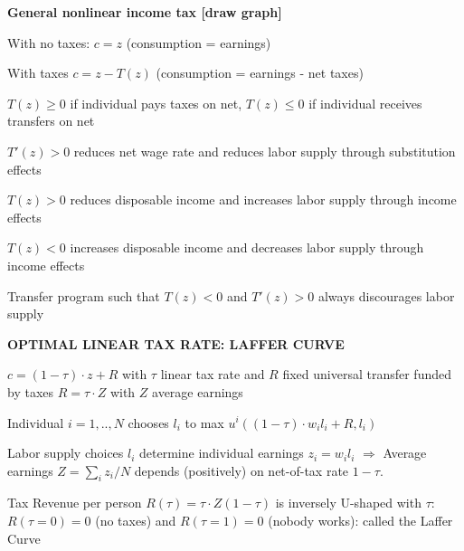 \documentclass[landscape]{slides}
\begin{document}
\begin{slide}

\end{slide}

\begin{slide}
\begin{center}
{\bf General nonlinear income tax [draw graph]}
\end{center}
With no taxes: $c= z$ (consumption = earnings)

With taxes $c=z-T(z)$ (consumption = earnings - net taxes)

$T(z) \geq 0$ if individual pays taxes on net, $T(z) \leq 0$ if individual receives transfers on net

$T'(z)>0$ reduces net wage rate and reduces labor supply through substitution effects

$T(z) >0$ reduces disposable income and increases labor supply through income effects

$T(z) < 0$ increases disposable income and decreases labor supply through income effects

Transfer program such that $T(z) <0$ and $T'(z)>0$ always discourages labor supply

\end{slide}


\begin{slide}

\end{slide}


\begin{slide}
\begin{center}
{\bf OPTIMAL LINEAR TAX RATE: LAFFER CURVE}
\end{center}
$c=(1-\tau)\cdot z + R$ with $\tau$ linear tax rate and $R$ fixed universal transfer funded
by taxes $R=\tau \cdot Z$ with $Z$ average earnings

Individual $i=1,..,N$ chooses $l_i$ to max $u^i((1-\tau)\cdot w_i l_i + R,l_i)$

Labor supply choices $l_i$ determine individual earnings $z_i=w_i l_i$ $\Rightarrow$ Average
earnings $Z=\sum_i z_i/N$ depends (positively) on net-of-tax rate $1-\tau$.

Tax Revenue per person $R(\tau)=\tau \cdot Z(1-\tau)$ is inversely U-shaped
with $\tau$: $R(\tau=0)=0$ (no taxes) and $R(\tau=1)=0$ (nobody
works): called the Laffer Curve

\end{slide}

\begin{slide}

\end{slide}
\end{document}
